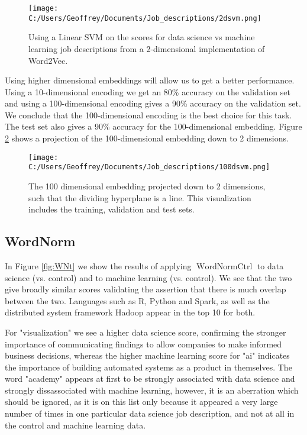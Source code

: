 \documentclass[12pt]{article}
\DeclareMathOperator{\WNt}{WordNormCtrl}
\begin{document}
\begin{figure}[h]
\texttt{[image: C:/Users/Geoffrey/Documents/Job\_descriptions/2dsvm.png]}
\caption{\label{fig:SVM2d} Using a Linear SVM on the scores for data science vs machine learning job descriptions from a 2-dimensional implementation of Word2Vec.}
\end{figure}

Using higher dimensional embeddings will allow us to get a better performance. Using a 10-dimensional encoding we get an 80\% accuracy on the validation set and using a 100-dimensional encoding gives a 90\% accuracy on the validation set. We conclude that the 100-dimensional encoding is the best choice for this task. The test set also gives a 90\% accuracy for the 100-dimensional embedding. Figure \ref{fig:100dsvm} shows a projection of the 100-dimensional embedding down to 2 dimensions.

\begin{figure}[h]
\texttt{[image: C:/Users/Geoffrey/Documents/Job\_descriptions/100dsvm.png]}
\caption{\label{fig:100dsvm} The 100 dimensional embedding projected down to 2 dimensions, such that the dividing hyperplane is a line. This visualization includes the training, validation and test sets.}
\end{figure}

\subsection{WordNorm} In Figure \ref{fig:WNt} we show the results of applying $\WNt$ to data science (vs. control) and to machine learning (vs. control). We see that the two give broadly similar scores validating the assertion that there is much overlap between the two. Languages such as R, Python and Spark, as well as the distributed system framework Hadoop appear in the top 10 for both.

For "visualization" we see a higher data science score, confirming the stronger importance of communicating findings to allow companies to make informed business decisions, whereas the higher machine learning score for "ai" indicates the importance of building automated systems as a product in themselves. The word "academy" appears at first to be strongly associated with data science and strongly dissassociated with machine learning, however, it is an aberration which should be ignored, as it is on this list only because it appeared a very large number of times in one particular data science job description, and not at all in the control and machine learning data.
\end{document}
